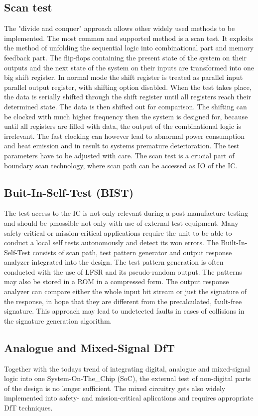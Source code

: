 \subsection{Scan test}
The "divide and conquer" approach allows other widely used methods to be implemented. The most common and supported method is a scan test. It exploits the method of unfolding the sequential logic into combinational part and memory feedback part. The flip-flops containing the present state of the system on their outputs and the next state of the system on their inputs are transformed into one big shift register. In normal mode the shift register is treated as parallel input parallel output register, with shifting option disabled. When the test takes place, the data is serially shifted through the shift register until all registers reach their determined state. The data is then shifted out for comparison. The shifting can be clocked with much higher frequency then the system is designed for, because until all registers are filled with data, the output of the combinational logic is irrelevant. The fast clocking can however lead to abnormal power consumption and heat emission and in result to systems premature deterioration. The test parameters have to be adjusted with care. The scan test is a crucial part of boundary scan technology, where scan path can be accessed as IO of the IC.

\subsection{Buit-In-Self-Test (BIST)}
The test access to the IC is not only relevant during a post manufacture testing and should be pmossible not only with use of external test equipment. Many safety-critical or mission-critical applications require the unit to be able to conduct a local self tests autonomously and detect its won errors. The Built-In-Self-Test consists of scan path, test pattern generator and output response analyzer integrated into the design. The test pattern generation is often conducted with the use of LFSR and its pseudo-random output. The patterns may also be stored in a ROM in a compressed form. The output response analyzer can compare either the whole input bit stream or just the signature of the response, in hope that they are different from the precalculated, fault-free signature. This approach may lead to undetected faults in cases of collisions in the signature generation algorithm.
\subsection{Analogue and Mixed-Signal DfT}
Together with the todays trend of integrating digital, analogue and mixed-signal logic into one System-On-The_Chip (SoC), the external test of non-digital parts of the design is no longer sufficient. The mixed circuitry gets also widely implemented into safety- and mission-critical aplications and requires appropriate DfT techniques. 

